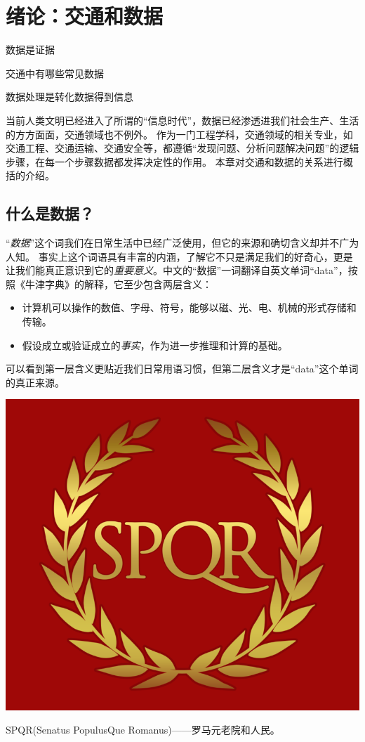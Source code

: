
\chapter{绪论：交通和数据}
\begin{cabstract}
    \item 数据是证据
    \item 交通中有哪些常见数据
    \item 数据处理是转化数据得到信息
\end{cabstract}

当前人类文明已经进入了所谓的“信息时代”，数据已经渗透进我们社会生产、生活的方方面面，交通领域也不例外。
作为一门工程学科，交通领域的相关专业，如交通工程、交通运输、交通安全等，都遵循“发现问题、分析问题解决问题”的逻辑步骤，在每一个步骤数据都发挥决定性的作用。
本章对交通和数据的关系进行概括的介绍。

\section{什么是数据？}

“\emph{数据}”这个词我们在日常生活中已经广泛使用，但它的来源和确切含义却并不广为人知。
事实上这个词语具有丰富的内涵，了解它不只是满足我们的好奇心，更是让我们能真正意识到它的\emph{重要意义}。中文的“数据”一词翻译自英文单词“data”，按照《牛津字典》的解释，它至少包含两层含义：
\begin{itemize}
    \item 计算机可以操作的数值、字母、符号，能够以磁、光、电、机械的形式存储和传输。
    \item 假设成立或验证成立的\emph{事实}，作为进一步推理和计算的基础。
\end{itemize}
可以看到第一层含义更贴近我们日常用语习惯，但第二层含义才是“data”这个单词的真正来源。

\begin{marginfigure}
\includegraphics[width=\linewidth]{images/spqr.png}
\caption{SPQR(Senatus PopulusQue Romanus)——罗马元老院和人民。}
\end{marginfigure}

